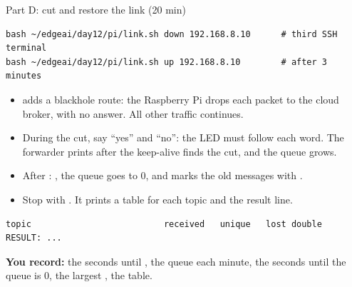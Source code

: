 \begin{frame}[fragile]{Part D: cut and restore the link (20 min)}
\begin{lstlisting}[style=shell]
bash ~/edgeai/day12/pi/link.sh down 192.168.8.10      # third SSH terminal
bash ~/edgeai/day12/pi/link.sh up 192.168.8.10        # after 3 minutes
\end{lstlisting}
  \small
  \begin{itemize}
    \item {} adds a blackhole route: the Raspberry Pi drops each
          packet to the cloud broker, with no answer. All other traffic
          continues.
    \item During the cut, say ``yes'' and ``no'': the LED must follow each
          word. The forwarder prints  after the keep-alive
          finds the cut, and the queue grows.
    \item After : , the queue goes
          to 0, and  marks the old messages with
          .
    \item Stop  with . It prints a table
          for each topic and the result line.
  \end{itemize}
\begin{lstlisting}[style=shell]
topic                          received   unique   lost double
RESULT: ...
\end{lstlisting}
  \textbf{You record:} the seconds until , the queue each
  minute, the seconds until the queue is 0, the largest , the
  table.
\end{frame}
